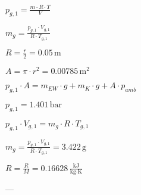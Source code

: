 \( p_{g,1} = \frac{m \cdot R \cdot T}{V} \)  

\( m_g = \frac{p_{g,1} \cdot V_{g,1}}{R \cdot T_{g,1}} \)  

\( R = \frac{r}{2} = 0.05 \, \text{m} \)  

\( A = \pi \cdot r^2 = 0.00785 \, \text{m}^2 \)  

\( p_{g,1} \cdot A = m_{EW} \cdot g + m_K \cdot g + A \cdot p_{amb} \)  

\( p_{g,1} = 1.401 \, \text{bar} \)  

\( p_{g,1} \cdot V_{g,1} = m_g \cdot R \cdot T_{g,1} \)  

\( m_g = \frac{p_{g,1} \cdot V_{g,1}}{R \cdot T_{g,1}} = 3.422 \, \text{g} \)  

\( R = \frac{R}{M} = 0.16628 \, \frac{\text{kJ}}{\text{kg} \cdot \text{K}} \)  

---